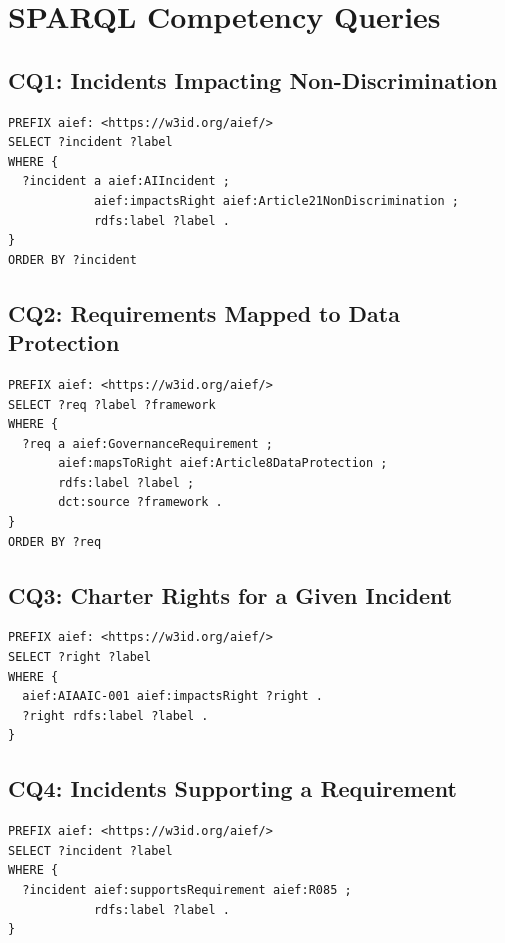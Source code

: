 \section{SPARQL Competency Queries}
\label{app:sparql}

\subsection{CQ1: Incidents Impacting Non-Discrimination}

\begin{lstlisting}[language=SPARQL,caption={CQ1: Retrieve incidents impacting Article 21.}]
PREFIX aief: <https://w3id.org/aief/>
SELECT ?incident ?label
WHERE {
  ?incident a aief:AIIncident ;
            aief:impactsRight aief:Article21NonDiscrimination ;
            rdfs:label ?label .
}
ORDER BY ?incident
\end{lstlisting}

\subsection{CQ2: Requirements Mapped to Data Protection}

\begin{lstlisting}[language=SPARQL,caption={CQ2: Retrieve requirements mapped to Article 8.}]
PREFIX aief: <https://w3id.org/aief/>
SELECT ?req ?label ?framework
WHERE {
  ?req a aief:GovernanceRequirement ;
       aief:mapsToRight aief:Article8DataProtection ;
       rdfs:label ?label ;
       dct:source ?framework .
}
ORDER BY ?req
\end{lstlisting}

\subsection{CQ3: Charter Rights for a Given Incident}

\begin{lstlisting}[language=SPARQL,caption={CQ3: Retrieve rights impacted by AIAAIC-001.}]
PREFIX aief: <https://w3id.org/aief/>
SELECT ?right ?label
WHERE {
  aief:AIAAIC-001 aief:impactsRight ?right .
  ?right rdfs:label ?label .
}
\end{lstlisting}

\subsection{CQ4: Incidents Supporting a Requirement}

\begin{lstlisting}[language=SPARQL,caption={CQ4: Retrieve incidents supporting R085.}]
PREFIX aief: <https://w3id.org/aief/>
SELECT ?incident ?label
WHERE {
  ?incident aief:supportsRequirement aief:R085 ;
            rdfs:label ?label .
}
\end{lstlisting}


